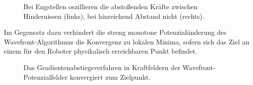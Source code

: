 \begin{figure}[H]
\begin{minipage}{0.46\textwidth}
		\centerline{}
	\end{minipage}
	\hspace*{\fill}
	\label{fig:oscillation}
	\caption{Bei Engstellen oszillieren die abstoßenden Kräfte zwischen Hindernissen (links), bei hinreichend Abstand nicht (rechts).}
\end{figure}

Im Gegensatz dazu verhindert die streng monotone Potenzialänderung des Wavefront-Algorithmus die Konvergenz zu lokalen Minima, sofern sich das Ziel an einem für den Roboter physikalisch erreichbaren Punkt befindet.
\begin{figure}[H]
	\footnotesize
	\centering
	\centerline{}
	\caption{Das Gradientenabstiegsverfahren in Kraftfeldern der Wavefront-Potenzialfelder konvergiert zum Zielpunkt.}
\end{figure}

